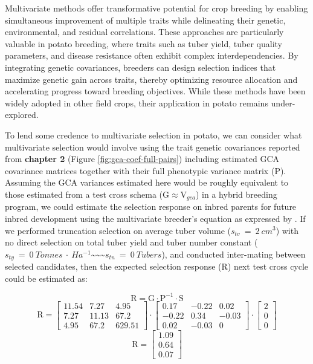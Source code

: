 \documentclass[
]{article}
\begin{document}
Multivariate methods offer transformative potential for crop breeding by
enabling simultaneous improvement of multiple traits while delineating
their genetic, environmental, and residual correlations. These
approaches are particularly valuable in potato breeding, where traits
such as tuber yield, tuber quality parameters, and disease resistance
often exhibit complex interdependencies. By integrating genetic
covariances, breeders can design selection indices that maximize genetic
gain across traits, thereby optimizing resource allocation and
accelerating progress toward breeding objectives. While these methods
have been widely adopted in other field crops, their application in
potato remains under-explored.

To lend some credence to multivariate selection in potato, we can
consider what multivariate selection would involve using the trait
genetic covariances reported from \textbf{chapter 2} (Figure
\ref{fig:gca-coef-full-pairs}) including estimated GCA covariance
matrices together with their full phenotypic variance matrix
(\(\mathrm P\)). Assuming the GCA variances estimated here would be
roughly equivalent to those estimated from a test cross schema
(\(\mathrm {G} \approx \mathrm {V}_{gca}\)) in a hybrid breeding
program, we could estimate the selection response on inbred parents for
future inbred development using the multivariate breeder's equation as
expressed by \textcite{Lande1983}. If we performed truncation selection
on average tuber volume (\(s_{tv}~=~2~cm^3\)) with no direct selection
on total tuber yield and tuber number constant
(\(s_{ty}~=~0~Tonnes~\cdot~Ha^{-1}\)\textasciitilde\textasciitilde\textasciitilde{}\(s_{tn}~=~0~Tubers\)),
and conducted inter-mating between selected candidates, then the
expected selection response (\(\mathrm R\)) next test cross cycle could
be estimated as:

\[ \mathrm {R = G \cdot P^{-1} \cdot S}\]
\[ \mathrm {R} = \begin{bmatrix}11.54 & 7.27 & 4.95 \\ 7.27 & 11.13 & 67.2 \\ 4.95 & 67.2 & 629.51\end{bmatrix}\cdot\begin{bmatrix}0.17 & -0.22 & 0.02 \\ -0.22 & 0.34 & -0.03 \\ 0.02 & -0.03 & 0\end{bmatrix} \cdot \begin{bmatrix} 2 \\ 0 \\ 0 \end{bmatrix} \]
\[\mathrm {R} = \begin{bmatrix}1.09 \\ 0.64 \\ 0.07\end{bmatrix}\]
\end{document}

